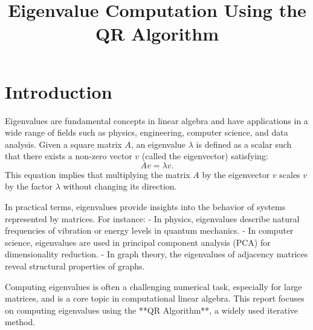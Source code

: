 \documentclass[12pt]{article}
\title{Eigenvalue Computation Using the QR Algorithm}
\author{}
\date{}
\begin{document}
\maketitle
\section*{Introduction}
Eigenvalues are fundamental concepts in linear algebra and have applications in a wide range of fields such as physics, engineering, computer science, and data analysis. Given a square matrix \( A \), an eigenvalue \( \lambda \) is defined as a scalar such that there exists a non-zero vector \( v \) (called the eigenvector) satisfying:
\begin{equation}
    A v = \lambda v.
\end{equation}
This equation implies that multiplying the matrix \( A \) by the eigenvector \( v \) scales \( v \) by the factor \( \lambda \) without changing its direction. 

In practical terms, eigenvalues provide insights into the behavior of systems represented by matrices. For instance:
- In physics, eigenvalues describe natural frequencies of vibration or energy levels in quantum mechanics.
- In computer science, eigenvalues are used in principal component analysis (PCA) for dimensionality reduction.
- In graph theory, the eigenvalues of adjacency matrices reveal structural properties of graphs.

Computing eigenvalues is often a challenging numerical task, especially for large matrices, and is a core topic in computational linear algebra. This report focuses on computing eigenvalues using the **QR Algorithm**, a widely used iterative method.
\end{document}
